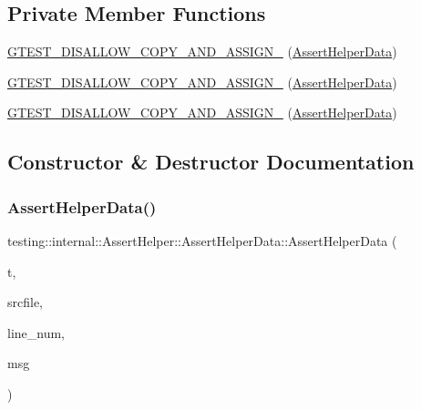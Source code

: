 \subsection*{Private Member Functions}
\begin{DoxyCompactItemize}
\item 
\mbox{\hyperlink{structtesting_1_1internal_1_1_assert_helper_1_1_assert_helper_data_a5cfdd2fca371e33566ffdb2357606df2}{G\+T\+E\+S\+T\+\_\+\+D\+I\+S\+A\+L\+L\+O\+W\+\_\+\+C\+O\+P\+Y\+\_\+\+A\+N\+D\+\_\+\+A\+S\+S\+I\+G\+N\+\_\+}} (\mbox{\hyperlink{structtesting_1_1internal_1_1_assert_helper_1_1_assert_helper_data}{Assert\+Helper\+Data}})
\item 
\mbox{\hyperlink{structtesting_1_1internal_1_1_assert_helper_1_1_assert_helper_data_a5cfdd2fca371e33566ffdb2357606df2}{G\+T\+E\+S\+T\+\_\+\+D\+I\+S\+A\+L\+L\+O\+W\+\_\+\+C\+O\+P\+Y\+\_\+\+A\+N\+D\+\_\+\+A\+S\+S\+I\+G\+N\+\_\+}} (\mbox{\hyperlink{structtesting_1_1internal_1_1_assert_helper_1_1_assert_helper_data}{Assert\+Helper\+Data}})
\item 
\mbox{\hyperlink{structtesting_1_1internal_1_1_assert_helper_1_1_assert_helper_data_a5cfdd2fca371e33566ffdb2357606df2}{G\+T\+E\+S\+T\+\_\+\+D\+I\+S\+A\+L\+L\+O\+W\+\_\+\+C\+O\+P\+Y\+\_\+\+A\+N\+D\+\_\+\+A\+S\+S\+I\+G\+N\+\_\+}} (\mbox{\hyperlink{structtesting_1_1internal_1_1_assert_helper_1_1_assert_helper_data}{Assert\+Helper\+Data}})
\end{DoxyCompactItemize}


\subsection{Constructor \& Destructor Documentation}
\mbox{\label{structtesting_1_1internal_1_1_assert_helper_1_1_assert_helper_data_ad2356f3f1e56d1a63562efe0f8b3f1bb}} 
\subsubsection{\texorpdfstring{AssertHelperData()}{AssertHelperData()}\hspace{0.1cm}{\footnotesize\ttfamily [1/3]}}
{\footnotesize\ttfamily testing\+::internal\+::\+Assert\+Helper\+::\+Assert\+Helper\+Data\+::\+Assert\+Helper\+Data (\begin{DoxyParamCaption}\item[{Test\+Part\+Result\+::\+Type}]{t,  }\item[{const char $\ast$}]{srcfile,  }\item[{int}]{line\+\_\+num,  }\item[{const char $\ast$}]{msg }\end{DoxyParamCaption})\hspace{0.3cm}{\ttfamily [inline]}}


